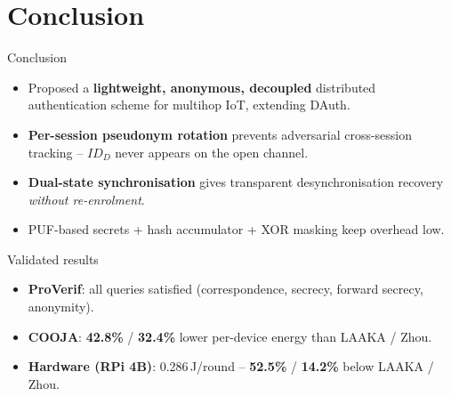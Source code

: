 \section{Conclusion}

\begin{frame}{Conclusion}
    \footnotesize
    \begin{itemize}
        \item Proposed a \textbf{lightweight, anonymous, decoupled} distributed authentication
        scheme for multihop IoT, extending DAuth.
        \item \textbf{Per-session pseudonym rotation} prevents adversarial cross-session tracking --
        $ID_D$ never appears on the open channel.
        \item \textbf{Dual-state synchronisation} gives transparent desynchronisation recovery
        \emph{without re-enrolment}.
        \item PUF-based secrets + hash accumulator + XOR masking keep overhead low.
    \end{itemize}

    \vspace{0.15cm}
    \begin{block}{Validated results}
        \begin{itemize}
            \item \textbf{ProVerif}: all queries satisfied (correspondence, secrecy, forward secrecy, anonymity).
            \item \textbf{COOJA}: \textbf{42.8\%} / \textbf{32.4\%} lower per-device energy than LAAKA / Zhou.
            \item \textbf{Hardware (RPi 4B)}: 0.286\,J/round -- \textbf{52.5\%} / \textbf{14.2\%} below LAAKA / Zhou.
        \end{itemize}
    \end{block}
\end{frame}

